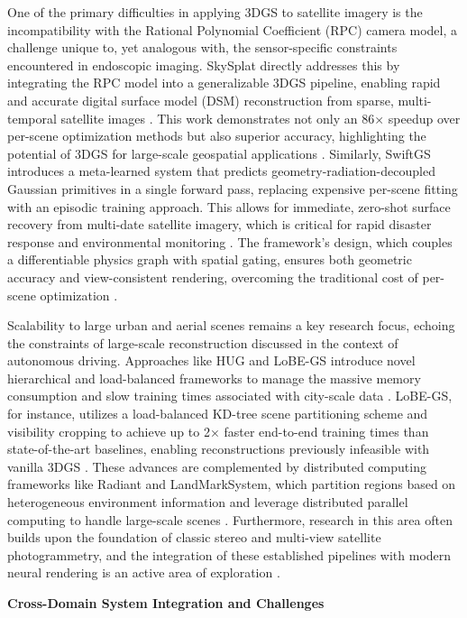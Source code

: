 \documentclass[11pt]{article}
\begin{document}
One of the primary difficulties in applying 3DGS to satellite imagery is the incompatibility with the Rational Polynomial Coefficient (RPC) camera model, a challenge unique to, yet analogous with, the sensor-specific constraints encountered in endoscopic imaging. SkySplat directly addresses this by integrating the RPC model into a generalizable 3DGS pipeline, enabling rapid and accurate digital surface model (DSM) reconstruction from sparse, multi-temporal satellite images \cite{ref699}. This work demonstrates not only an 86× speedup over per-scene optimization methods but also superior accuracy, highlighting the potential of 3DGS for large-scale geospatial applications \cite{ref699}. Similarly, SwiftGS introduces a meta-learned system that predicts geometry-radiation-decoupled Gaussian primitives in a single forward pass, replacing expensive per-scene fitting with an episodic training approach. This allows for immediate, zero-shot surface recovery from multi-date satellite imagery, which is critical for rapid disaster response and environmental monitoring \cite{ref700}. The framework's design, which couples a differentiable physics graph with spatial gating, ensures both geometric accuracy and view-consistent rendering, overcoming the traditional cost of per-scene optimization \cite{ref700}.

Scalability to large urban and aerial scenes remains a key research focus, echoing the constraints of large-scale reconstruction discussed in the context of autonomous driving. Approaches like HUG and LoBE-GS introduce novel hierarchical and load-balanced frameworks to manage the massive memory consumption and slow training times associated with city-scale data \cite{ref698,ref113}. LoBE-GS, for instance, utilizes a load-balanced KD-tree scene partitioning scheme and visibility cropping to achieve up to 2× faster end-to-end training times than state-of-the-art baselines, enabling reconstructions previously infeasible with vanilla 3DGS \cite{ref113}. These advances are complemented by distributed computing frameworks like Radiant and LandMarkSystem, which partition regions based on heterogeneous environment information and leverage distributed parallel computing to handle large-scale scenes \cite{ref701,ref702}. Furthermore, research in this area often builds upon the foundation of classic stereo and multi-view satellite photogrammetry, and the integration of these established pipelines with modern neural rendering is an active area of exploration \cite{ref703,ref704}.

\textbf{Cross-Domain System Integration and Challenges}
\end{document}

